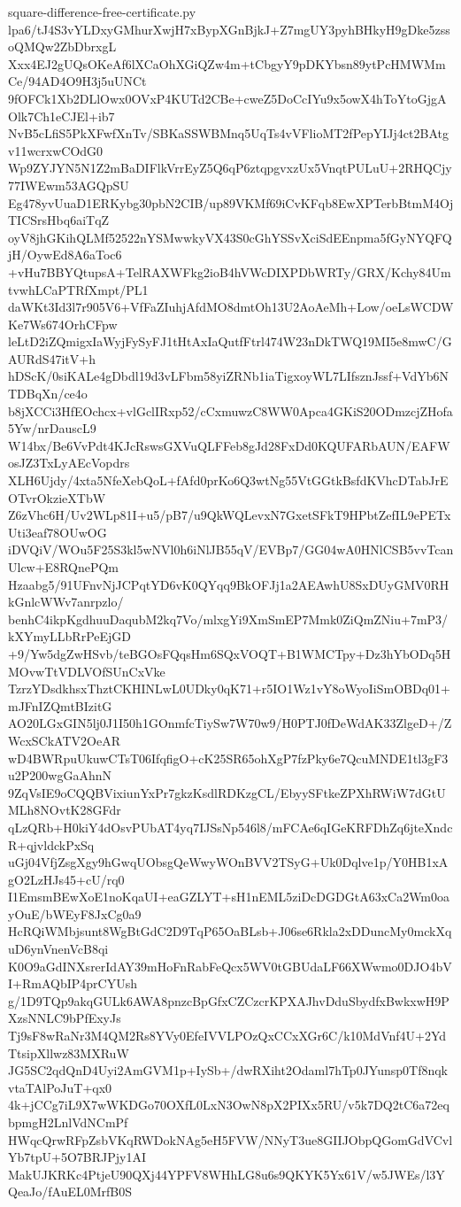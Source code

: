 \documentclass[11pt]{article}
\theoremstyle{definition}
\theoremstyle{remark}
\begin{document}
\begin{filecontents*}[overwrite]{square-difference-free-certificate.py}
lpa6/tJ4S3vYLDxyGMhurXwjH7xBypXGnBjkJ+Z7mgUY3pyhBHkyH9gDke5zssoQMQw2ZbDbrxgL
Xxx4EJ2gUQsOKeAf6lXCaOhXGiQZw4m+tCbgyY9pDKYbsn89ytPcHMWMmCe/94AD4O9H3j5uUNCt
9fOFCk1Xb2DLlOwx0OVxP4KUTd2CBe+cweZ5DoCcIYu9x5owX4hToYtoGjgAOlk7Ch1eCJEl+ib7
NvB5cLfiS5PkXFwfXnTv/SBKaSSWBMnq5UqTs4vVFlioMT2fPepYIJj4ct2BAtgv11wcrxwCOdG0
Wp9ZYJYN5N1Z2mBaDIFlkVrrEyZ5Q6qP6ztqpgvxzUx5VnqtPULuU+2RHQCjy77IWEwm53AGQpSU
Eg478yvUuaD1ERKybg30pbN2CIB/up89VKMf69iCvKFqb8EwXPTerbBtmM4OjTICSrsHbq6aiTqZ
oyV8jhGKihQLMf52522nYSMwwkyVX43S0cGhYSSvXciSdEEnpma5fGyNYQFQjH/OywEd8A6aToc6
+vHu7BBYQtupsA+TelRAXWFkg2ioB4hVWcDIXPDbWRTy/GRX/Kchy84UmtvwhLCaPTRfXmpt/PL1
daWKt3Id3l7r905V6+VfFaZIuhjAfdMO8dmtOh13U2AoAeMh+Low/oeLsWCDWKe7Ws674OrhCFpw
leLtD2iZQmigxIaWyjFySyFJ1tHtAxIaQutfFtrl474W23nDkTWQ19MI5e8mwC/GAURdS47itV+h
hDScK/0siKALe4gDbdl19d3vLFbm58yiZRNb1iaTigxoyWL7LIfsznJssf+VdYb6NTDBqXn/ce4o
b8jXCCi3HfEOchcx+vlGclIRxp52/cCxmuwzC8WW0Apca4GKiS20ODmzcjZHofa5Yw/nrDauscL9
W14bx/Be6VvPdt4KJcRswsGXVuQLFFeb8gJd28FxDd0KQUFARbAUN/EAFWosJZ3TxLyAEcVopdrs
XLH6Ujdy/4xta5NfeXebQoL+fAfd0prKo6Q3wtNg55VtGGtkBsfdKVhcDTabJrEOTvrOkzieXTbW
Z6zVhc6H/Uv2WLp81I+u5/pB7/u9QkWQLevxN7GxetSFkT9HPbtZefIL9ePETxUti3eaf78OUwOG
iDVQiV/WOu5F25S3kl5wNVl0h6iNlJB55qV/EVBp7/GG04wA0HNlCSB5vvTcanUlcw+E8RQnePQm
Hzaabg5/91UFnvNjJCPqtYD6vK0QYqq9BkOFJj1a2AEAwhU8SxDUyGMV0RHkGnlcWWv7anrpzlo/
benhC4ikpKgdhuuDaqubM2kq7Vo/mlxgYi9XmSmEP7Mmk0ZiQmZNiu+7mP3/kXYmyLLbRrPeEjGD
+9/Yw5dgZwHSvb/teBGOsFQqsHm6SQxVOQT+B1WMCTpy+Dz3hYbODq5HMOvwTtVDLVOfSUnCxVke
TzrzYDsdkhsxThztCKHINLwL0UDky0qK71+r5IO1Wz1vY8oWyoIiSmOBDq01+mJFnIZQmtBIzitG
AO20LGxGIN5lj0J1I50h1GOnmfcTiySw7W70w9/H0PTJ0fDeWdAK33ZlgeD+/ZWcxSCkATV2OeAR
wD4BWRpuUkuwCTsT06IfqfigO+cK25SR65ohXgP7fzPky6e7QcuMNDE1tl3gF3u2P200wgGaAhnN
9ZqVsIE9oCQQBVixiunYxPr7gkzKsdlRDKzgCL/EbyySFtkeZPXhRWiW7dGtUMLh8NOvtK28GFdr
qLzQRb+H0kiY4dOsvPUbAT4yq7IJSsNp546l8/mFCAe6qIGeKRFDhZq6jteXndcR+qjvldckPxSq
uGj04VfjZsgXgy9hGwqUObsgQeWwyWOnBVV2TSyG+Uk0Dqlve1p/Y0HB1xAgO2LzHJs45+cU/rq0
I1EmsmBEwXoE1noKqaUI+eaGZLYT+sH1nEML5ziDcDGDGtA63xCa2Wm0oayOuE/bWEyF8JxCg0a9
HcRQiWMbjsunt8WgBtGdC2D9TqP65OaBLsb+J06se6Rkla2xDDuncMy0mckXquD6ynVnenVcB8qi
K0O9aGdINXsrerIdAY39mHoFnRabFeQcx5WV0tGBUdaLF66XWwmo0DJO4bVI+RmAQbIP4prCYUsh
g/1D9TQp9akqGULk6AWA8pnzcBpGfxCZCzcrKPXAJhvDduSbydfxBwkxwH9PXzsNNLC9bPfExyJs
Tj9sF8wRaNr3M4QM2Rs8YVy0EfeIVVLPOzQxCCxXGr6C/k10MdVnf4U+2YdTtsipXllwz83MXRuW
JG5SC2qdQnD4Uyi2AmGVM1p+IySb+/dwRXiht2Odaml7hTp0JYunsp0Tf8nqkvtaTAlPoJuT+qx0
4k+jCCg7iL9X7wWKDGo70OXfL0LxN3OwN8pX2PIXx5RU/v5k7DQ2tC6a72eqbpmgH2LnlVdNCmPf
HWqcQrwRFpZsbVKqRWDokNAg5eH5FVW/NNyT3ue8GIIJObpQGomGdVCvlYb7tpU+5O7BRJPjy1AI
MakUJKRKc4PtjeU90QXj44YPFV8WHhLG8u6s9QKYK5Yx61V/w5JWEs/l3YQeaJo/fAuEL0MrfB0S

\end{filecontents*}
\end{document}

